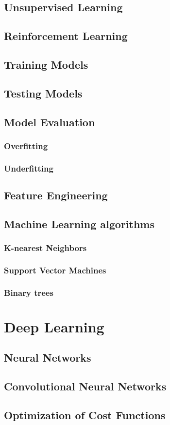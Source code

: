 \subsection{Unsupervised Learning}
\subsection{Reinforcement Learning}

\subsection{Training Models}
\subsection{Testing Models}
\subsection{Model Evaluation}
\subsubsection{Overfitting}
\subsubsection{Underfitting}
\subsection{Feature Engineering}
\subsection{Machine Learning algorithms}\label{ch:ml_algs}
\subsubsection{K-nearest Neighbors}
\subsubsection{Support Vector Machines}
\subsubsection{Binary trees}

\section{Deep Learning}
\subsection{Neural Networks}
\subsection{Convolutional Neural Networks}
\subsection{Optimization of Cost Functions}

